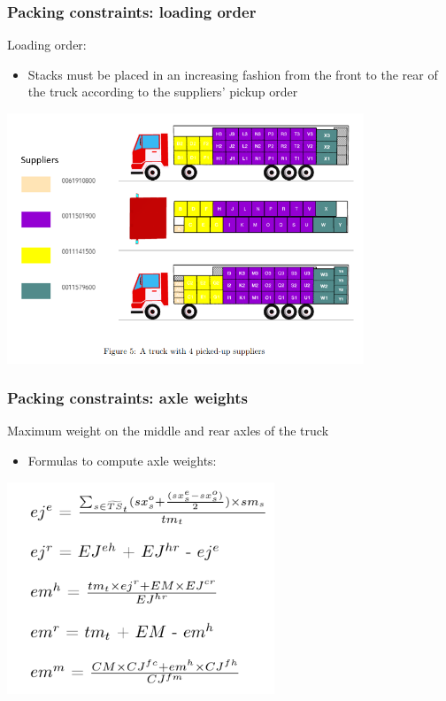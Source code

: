 \documentclass[10pt]{beamer}
\begin{document}
\begin{frame}
  \frametitle{Packing constraints: loading order}

  Loading order:
  \begin{itemize}
    \item Stacks must be placed in an increasing fashion from the front to the rear of the truck according to the suppliers’ pickup order
  \end{itemize}

  \begin{center}
    \includegraphics[width=0.8\textwidth]{img/loading_order.png}
  \end{center}
  
\end{frame}

\begin{frame}
  \frametitle{Packing constraints: axle weights}

  Maximum weight on the middle and rear axles of the truck
  \begin{itemize}
    \item Formulas to compute axle weights:
  \end{itemize}

  \begin{center}
    \includegraphics[width=0.6\textwidth]{img/axle_weight_equations.png}
  \end{center}
  
\end{frame}
\end{document}
